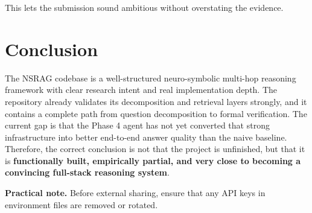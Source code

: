 \documentclass[11pt]{article}
\begin{document}
This lets the submission sound ambitious without overstating the evidence.

\section{Conclusion}
The NSRAG codebase is a well-structured neuro-symbolic multi-hop reasoning framework with clear research intent and real implementation depth. The repository already validates its decomposition and retrieval layers strongly, and it contains a complete path from question decomposition to formal verification. The current gap is that the Phase 4 agent has not yet converted that strong infrastructure into better end-to-end answer quality than the naive baseline. Therefore, the correct conclusion is not that the project is unfinished, but that it is \textbf{functionally built, empirically partial, and very close to becoming a convincing full-stack reasoning system}.

\vspace{0.7em}
\noindent\textbf{Practical note.} Before external sharing, ensure that any API keys in environment files are removed or rotated.
\end{document}
